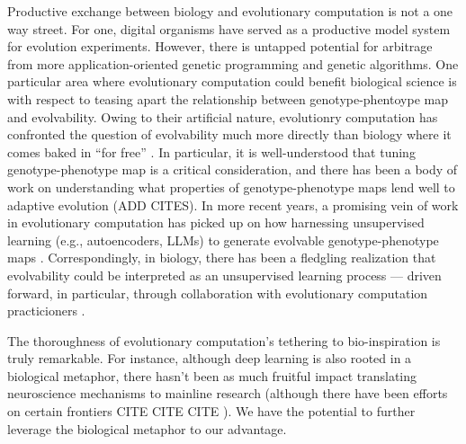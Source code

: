 Productive exchange between biology and evolutionary computation is not a one way street.
For one, digital organisms have served as a productive model system for evolution experiments.
However, there is untapped potential for arbitrage from more application-oriented genetic programming and genetic algorithms.
One particular area where evolutionary computation could benefit biological science is with respect to teasing apart the relationship between genotype-phentoype map and evolvability.
Owing to their artificial nature, evolutionry computation has confronted the question of evolvability much more directly than biology where it comes baked in ``for free'' \citep{kirschner1998evolvability}.
In particular, it is well-understood that tuning genotype-phenotype map is a critical consideration, and there has been a body of work on understanding what properties of genotype-phenotype maps lend well to adaptive evolution (ADD CITES).
In more recent years, a promising vein of work in evolutionary computation has picked up on how harnessing unsupervised learning (e.g., autoencoders, LLMs) to generate evolvable genotype-phenotype maps \citep{moreno2018understanding,bradley2024openelm,wittenberg2023denoising,MORECITES}.
Correspondingly, in biology, there has been a fledgling realization that evolvability could be interpreted as an unsupervised learning process --- driven forward, in particular, through collaboration with evolutionary computation practicioners \citep{kouvaris2017evolution,szilagyi2020phenotypes}.

The thoroughness of evolutionary computation's tethering to bio-inspiration is truly remarkable.
For instance, although deep learning is also rooted in a biological metaphor, there hasn't been as much fruitful impact translating neuroscience mechanisms to mainline research (although there have been efforts on certain frontiers CITE CITE CITE \citep{furber2014spinnaker}).
We have the potential to further leverage the biological metaphor to our advantage.
